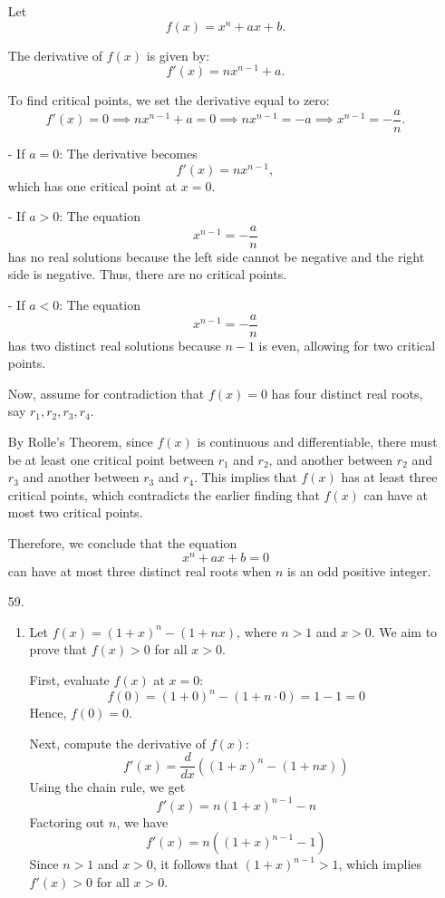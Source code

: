 \documentclass[12pt]{article}
\begin{document}
\begin{enumerate}[start=1,label={\bfseries. },leftmargin=1in]
    Let 
    \[
    f(x) = x^n + ax + b.
    \]

    The derivative of \( f(x) \) is given by:
    \[
    f'(x) = n x^{n-1} + a.
    \]

    To find critical points, we set the derivative equal to zero:
    \[
    f'(x) = 0 \implies n x^{n-1} + a = 0 \implies n x^{n-1} = -a \implies x^{n-1} = -\frac{a}{n}.
    \]

    - If \( a = 0 \): The derivative becomes 
    \[
    f'(x) = n x^{n-1},
    \]
    which has one critical point at \( x = 0 \).

    - If \( a > 0 \): The equation 
    \[
    x^{n-1} = -\frac{a}{n}
    \]
    has no real solutions because the left side cannot be negative and the right side is negative. Thus, there are no critical points.

    - If \( a < 0 \): The equation 
    \[
    x^{n-1} = -\frac{a}{n}
    \]
    has two distinct real solutions because \( n-1 \) is even, allowing for two critical points.

    Now, assume for contradiction that \( f(x) = 0 \) has four distinct real roots, say \( r_1, r_2, r_3, r_4 \).

    By Rolle's Theorem, since \( f(x) \) is continuous and differentiable, there must be at least one critical point between \( r_1 \) and \( r_2 \), and another between \( r_2 \) and \( r_3 \) and another between $r_3$ and $r_4$. This implies that \( f(x) \) has at least three critical points, which contradicts the earlier finding that \( f(x) \) can have at most two critical points.

    Therefore, we conclude that the equation 
    \[
    x^n + ax + b = 0
    \]
    can have at most three distinct real roots when \( n \) is an odd positive integer.

\item [59. ]
\begin{enumerate}

    \item Let \( f(x) = (1 + x)^n - (1 + nx) \), where \( n > 1 \) and \( x > 0 \). We aim to prove that \( f(x) > 0 \) for all \( x > 0 \). 
    
    First, evaluate \( f(x) \) at \( x = 0 \):
    \[
    f(0) = (1 + 0)^n - (1 + n \cdot 0) = 1 - 1 = 0
    \]
    Hence, \( f(0) = 0 \).

    Next, compute the derivative of \( f(x) \):
    \[
    f'(x) = \frac{d}{dx} \left( (1 + x)^n - (1 + nx) \right)
    \]
    Using the chain rule, we get
    \[
    f'(x) = n(1 + x)^{n-1} - n
    \]
    Factoring out \( n \), we have
    \[
    f'(x) = n \left( (1 + x)^{n-1} - 1 \right)
    \]
    Since \( n > 1 \) and \( x > 0 \), it follows that \( (1 + x)^{n-1} > 1 \), which implies \( f'(x) > 0 \) for all \( x > 0 \).


\end{enumerate}
\end{enumerate}
\end{document}
